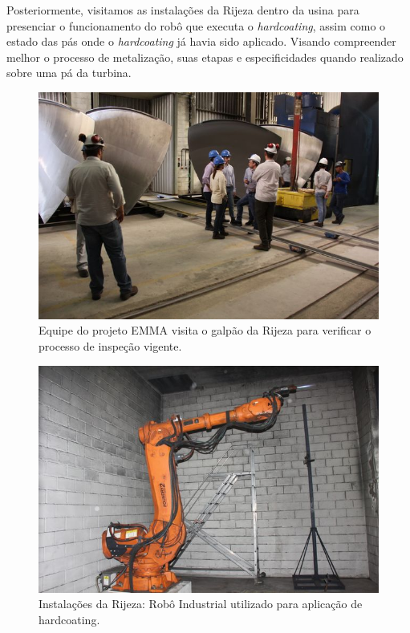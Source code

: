 \documentclass[a4paper,11pt,oneside,openany,brazilian,
version=last,draft=false,]{report}
\begin{document}
\begin{twocolumn}
Posteriormente, visitamos as instala\-ções da Rijeza dentro da usina para
presenciar o funcionamento do robô que executa o \textit{hardcoating}, assim como o
estado das pás onde o \textit{hardcoating} já havia sido aplicado. Visando compreender
melhor o processo de metalização, suas etapas e especificidades quando realizado
sobre uma pá da turbina.

\begin{figure}[H]
\centering
\includegraphics[width=\columnwidth]{Fotos/img_4881.jpg}
\caption{Equipe do projeto EMMA visita o galpão da Rijeza para verificar o
processo de inspeção vigente.}
\label{fig:gull}
\end{figure}
\begin{figure}[H]
\centering
\includegraphics[width=\columnwidth]{Fotos/img_4858.jpg}
\caption{Instalações da Rijeza: Robô Industrial utilizado para aplicação de hardcoating.}
\end{figure}


\end{twocolumn}
\end{document}
